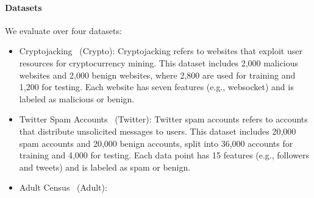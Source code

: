 \paragraph{Datasets}
We evaluate \tool over four datasets:%
 \begin{itemize}[nosep,nolistsep]
    \item Cryptojacking~\cite{ref_43} (Crypto): %
    Cryptojacking refers to websites that exploit user resources for cryptocurrency mining. This dataset includes 2,000 malicious websites and 2,000 benign websites, where 2,800 are used for training and 1,200 for testing. Each website has seven features (e.g., websocket) and is labeled as malicious or benign.
    \item Twitter Spam Accounts~\cite{ref_44} (Twitter): %
 Twitter spam accounts refers to accounts that distribute unsolicited messages to users. This dataset includes 20,000 spam accounts and 20,000 benign accounts, split into 36,000 accounts for training and 4,000 for testing. Each data point has 15 features (e.g., followers and tweets) and is labeled as spam or benign.
    \item Adult Census~\cite{ref_45} (Adult): %

\end{itemize}
